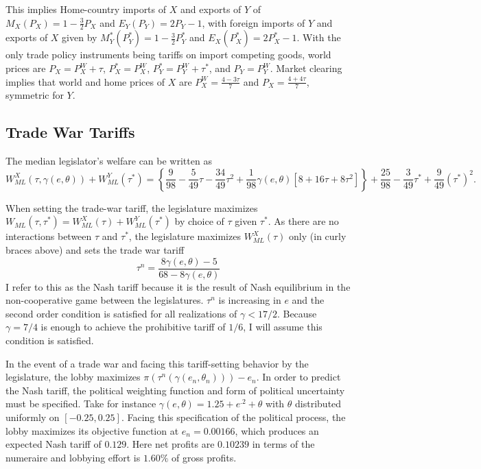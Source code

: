 \documentclass[10pt]{article}
\newcommand{\ve}{\theta}
\newcommand{\ta}{\theta}
\newcommand{\ga}{\gamma}
\begin{document}
This implies Home-country imports of $X$ and exports of $Y$ of $M_X(P_X)= 1 - \frac{3}{2}P_X$ and $E_Y(P_Y)= 2P_Y -1$, with foreign imports of $Y$ and exports of $X$ given by $M_Y^*(P_Y^*)= 1 - \frac{3}{2}P_Y^*$ and $E_X(P_X^*)= 2P_X^* -1$. With the only trade policy instruments being tariffs on import competing goods, world prices are $P_X = P_X^W + \tau$, $P_X^* = P_X^W$, $P_Y^* = P_Y^W + \tau^*$, and $P_Y = P_Y^W$. Market clearing implies that world and home prices of $X$ are $P_X^W = \frac{4-3\tau}{7}$ and $P_X = \frac{4+4\tau}{7}$, symmetric for $Y$. \\

\subsection{Trade War Tariffs}
The median legislator's welfare can be written as 
\[
  W_{\mathit{ML}}^X(\tau,\ga(e,\ve)) + W_{\mathit{ML}}^Y(\tau^*) = \left\{\frac{9}{98} - \frac{5}{49}\tau - \frac{34}{49}\tau^2 +\frac{1}{98}\ga(e,\ve)\left[ 8 + 16\tau + 8\tau^2 \right] \right\}+ \frac{25}{98} - \frac{3}{49}\tau^* + \frac{9}{49}(\tau^*)^2.
\]

When setting the trade-war tariff, the legislature maximizes $W_{\mathit{ML}}(\tau, \tau^*) = W_{\mathit{ML}}^X(\tau) + W_{\mathit{ML}}^Y(\tau^*)$ by choice of $\tau$ given $\tau^*$. As there are no interactions between $\tau$ and $\tau^*$, the legislature maximizes $W_{\mathit{ML}}^X(\tau)$ only (in curly braces above) and sets the trade war tariff
\[
  \tau^n = \frac{8\ga(e,\ve)-5}{68-8\ga(e,\ve)}
\]
I refer to this as the Nash tariff because it is the result of Nash equilibrium in the non-cooperative game between the legislatures. $\tau^n$ is increasing in $e$ and the second order condition is satisfied for all realizations of $\ga < 17/2$. Because $\ga = 7/4$ is enough to achieve the prohibitive tariff of $1/6$, I will assume this condition is satisfied. 

In the event of a trade war and facing this tariff-setting behavior by the legislature, the lobby maximizes $\pi\left(\tau^n\left(\ga\left(e_n,\ve_n\right)\right)\right) - e_n$. In order to predict the Nash tariff, the political weighting function and form of political uncertainty must be specified. Take for instance $\ga(e,\ve) = 1.25 + e^{.2} + \ta$ with $\ve$ distributed uniformly on $[-0.25,0.25]$. Facing this specification of the political process, the lobby maximizes its objective function at $e_n = 0.00166$, which produces an expected Nash tariff of $0.129$. Here net profits are $0.10239$ in terms of the numeraire and lobbying effort is $1.60\%$ of gross profits.
\end{document}
